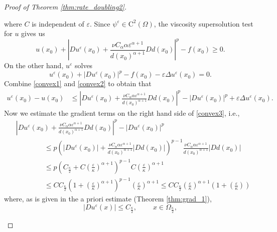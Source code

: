 \documentclass[12pt,reqno]{amsart}
\numberwithin{figure}{section}
\theoremstyle{plain}
\theoremstyle{remark}
\numberwithin{equation}{section}
\newcommand{\rmC}{\mathrm{C}}
\begin{document}
\begin{proof}[Proof of Theorem \ref{thm:rate_doubling2}]
\begin{itemize}
\begin{equation}
\end{equation}
where $C$ is independent of $\varepsilon$. Since $\psi^\varepsilon\in \rmC^2(\Omega)$, the viscosity supersolution test for $u$ gives us
\begin{equation}\label{convex1}
    u(x_0) + \left|Du^\varepsilon(x_0) + \frac{\nu C_\alpha \alpha \varepsilon^{\alpha+1}}{d(x_0)^{\alpha+1}}D d(x_0)\right|^p - f(x_0) \geq 0.
\end{equation}
On the other hand, $u^\varepsilon$ solves
\begin{equation}\label{convex2}
    u^\varepsilon(x_0) + |Du^\varepsilon(x_0)|^p - f(x_0) - \varepsilon \Delta u^\varepsilon(x_0) = 0.
\end{equation}
Combine \eqref{convex1} and \eqref{convex2} to obtain that
\begin{align}\label{convex3}
    u^\varepsilon(x_0) - u(x_0) &\leq \left|Du^\varepsilon(x_0) + \frac{\nu C_\alpha \alpha \varepsilon^{\alpha+1}}{d(x_0)^{\alpha+1}}D d(x_0)\right|^p - |Du^\varepsilon(x_0)|^p + \varepsilon\Delta u^\varepsilon(x_0).
\end{align}
Now we estimate the gradient terms on the right hand side of \eqref{convex3}, i.e., 
\begin{align}\label{convex4}
    &\left|Du^\varepsilon(x_0) + \frac{\nu C_\alpha \alpha \varepsilon^{\alpha+1}}{d(x_0)^{\alpha+1}}D d(x_0)\right|^p - |Du^\varepsilon(x_0)|^p\nonumber \\
    &\qquad \qquad \leq p\left(|Du^\varepsilon(x_0)| + \frac{\nu C_\alpha \alpha \varepsilon^{\alpha+1}}{d(x_0)^{\alpha+1}}\left|D d(x_0)\right|\right)^{p-1} \frac{\nu C_\alpha \alpha \varepsilon^{\alpha+1}}{d(x_0)^{\alpha+1}}|D d(x_0)|\nonumber\\
    &\qquad \qquad \leq p\left(C_\frac{\kappa}{2} + C\left(\frac{\varepsilon}{\kappa}\right)^{\alpha+1}\right)^{p-1} C\left(\frac{\varepsilon}{\kappa}\right)^{\alpha+1}\nonumber\\
    &\qquad\qquad\leq CC_\frac{\kappa}{2}\left(1+\left(\frac{\varepsilon}{\kappa}\right)^{\alpha+1}\right)^{p-1} \left(\frac{\varepsilon}{\kappa}\right)^{\alpha+1} \leq CC_\frac{\kappa}{2} \left(\frac{\varepsilon}{\kappa}\right)^{\alpha+1}\left(1+ \left(\frac{\varepsilon}{\kappa}\right)\right)
\end{align}
where, as is given in the a priori estimate (Theorem \ref{thm:grad_1}),
\begin{equation}\label{est_Ckappa}
    |Du^\varepsilon(x)|\leq C_{\frac{\kappa}{2}}, \qquad \;x\in \Omega_{\frac{\kappa}{2}},
\end{equation}

\end{itemize}
\end{proof}
\end{document}
